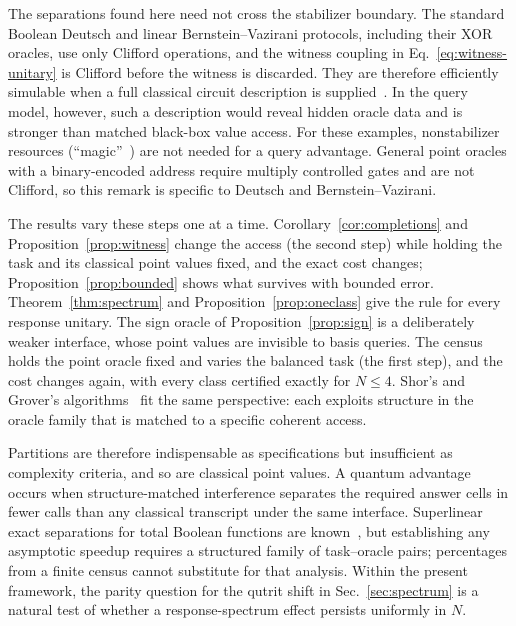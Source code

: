 \documentclass[
  aps,
  pra,
  reprint,
  nofootinbib
]{revtex4-2}
\begin{document}
The separations found here need not cross the stabilizer boundary. The standard Boolean
Deutsch and linear Bernstein--Vazirani protocols, including their XOR oracles,
use only Clifford operations, and the witness coupling in
Eq.~\eqref{eq:witness-unitary} is Clifford before the witness is discarded.
They are therefore efficiently simulable when a full classical circuit
description is supplied~\cite{GottesmanKnill,AaronsonGottesman2004}. In the
query model, however, such a description would reveal hidden oracle data and
is stronger than matched black-box value access. For these examples,
nonstabilizer resources (``magic''~\cite{Veitch2014}) are not needed for a
query advantage. General point oracles with a binary-encoded address require
multiply controlled gates and are not Clifford, so this remark is specific to
Deutsch and Bernstein--Vazirani.

The results vary these steps one at a time. Corollary~\ref{cor:completions}
and Proposition~\ref{prop:witness} change the access (the second step) while
holding the task and its classical point values fixed, and the exact cost
changes; Proposition~\ref{prop:bounded} shows what survives with bounded
error. Theorem~\ref{thm:spectrum} and Proposition~\ref{prop:oneclass} give the
rule for every response unitary. The sign oracle of
Proposition~\ref{prop:sign} is a deliberately weaker interface, whose point
values are invisible to basis queries. The census holds the point oracle fixed and varies the
balanced task (the first step), and the cost changes again, with every class certified exactly for
\(N\le4\). Shor's and Grover's algorithms~\cite{shor:94,grover} fit the same
perspective: each exploits structure in the oracle family that is matched to a
specific coherent access.

Partitions are therefore indispensable as specifications but insufficient as
complexity criteria, and so are classical point values. A quantum advantage
occurs when structure-matched interference separates the required answer cells
in fewer calls than any classical transcript under the same interface.
Superlinear exact separations for total Boolean functions are
known~\cite{Ambainis2016SuperlinearExact}, but establishing any asymptotic
speedup requires a structured family of task--oracle pairs; percentages from a
finite census cannot substitute for that analysis. Within the present
framework, the parity question for the qutrit shift in Sec.~\ref{sec:spectrum}
is a natural test of whether a response-spectrum effect persists uniformly in
\(N\).
\end{document}
